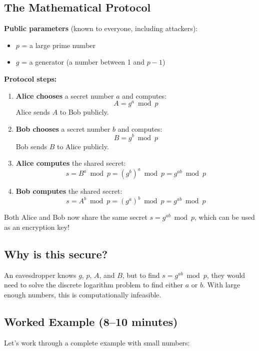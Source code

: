 \documentclass[11pt]{article}
\begin{document}
\subsection*{The Mathematical Protocol}

\textbf{Public parameters} (known to everyone, including attackers):
\begin{itemize}
    \item $p$ = a large prime number
    \item $g$ = a generator (a number between 1 and $p-1$)
\end{itemize}

\textbf{Protocol steps:}

\begin{enumerate}
    \item \textbf{Alice chooses} a secret number $a$ and computes:
    \[
    A = g^a \bmod p
    \]
    Alice sends $A$ to Bob publicly.
    
    \item \textbf{Bob chooses} a secret number $b$ and computes:
    \[
    B = g^b \bmod p
    \]
    Bob sends $B$ to Alice publicly.
    
    \item \textbf{Alice computes} the shared secret:
    \[
    s = B^a \bmod p = (g^b)^a \bmod p = g^{ab} \bmod p
    \]
    
    \item \textbf{Bob computes} the shared secret:
    \[
    s = A^b \bmod p = (g^a)^b \bmod p = g^{ab} \bmod p
    \]
\end{enumerate}

Both Alice and Bob now share the same secret $s = g^{ab} \bmod p$, which can be used as an encryption key!

\subsection*{Why is this secure?}
An eavesdropper knows $g$, $p$, $A$, and $B$, but to find $s = g^{ab} \bmod p$, they would need to solve the discrete logarithm problem to find either $a$ or $b$. With large enough numbers, this is computationally infeasible.

\subsection*{Worked Example (8--10 minutes)}

Let's work through a complete example with small numbers:
\end{document}
